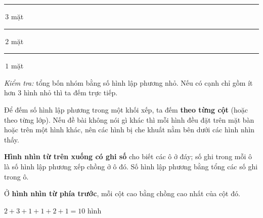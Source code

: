 \begin{knowbox}
\begin{minipage}[t]{0.37\linewidth}
\begin{tikzpicture}[scale=0.5]
\end{tikzpicture}\par\smallskip
{\scriptsize\textcolor{tmOrange}{\rule{6pt}{6pt}}\,$3$ mặt\quad\textcolor{tmGreen}{\rule{6pt}{6pt}}\,$2$ mặt\quad\textcolor{tmBlue}{\rule{6pt}{6pt}}\,$1$ mặt}
\end{minipage}\par
\smallskip
\emph{Kiểm tra:} tổng bốn nhóm bằng số hình lập phương nhỏ. Nếu có cạnh chỉ gồm ít hơn $3$ hình nhỏ thì ta đếm trực tiếp.
\end{knowbox}

\begin{knowbox}
\begin{minipage}[t]{0.6\linewidth}
Để đếm số hình lập phương trong một khối xếp, ta đếm \textbf{theo từng cột} (hoặc theo từng lớp). Nếu đề bài không nói gì khác thì mỗi hình đều đặt trên mặt bàn hoặc trên một hình khác, nên các hình bị che khuất nằm bên dưới các hình nhìn thấy.\par
\smallskip
\textbf{Hình nhìn từ trên xuống có ghi số} cho biết các ô ở đáy; số ghi trong mỗi ô là số hình lập phương xếp chồng ở ô đó. Số hình lập phương bằng tổng các số ghi trong ô.\par
\smallskip
Ở \textbf{hình nhìn từ phía trước}, mỗi cột cao bằng chồng cao nhất của cột đó.
\end{minipage}\hfill
\begin{minipage}[t]{0.36\linewidth}\vspace{2pt}\centering
{}\par\smallskip
$2+3+1+1+2+1=10$ hình
\end{minipage}
\end{knowbox}
\gap
